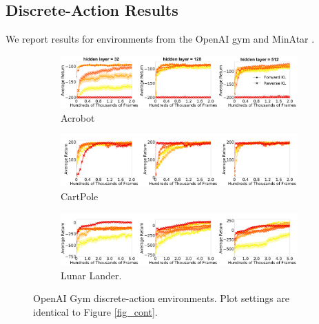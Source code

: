 \documentclass[twoside,11pt]{article}
\begin{document}
\subsection{Discrete-Action Results}
We report results for environments from the OpenAI gym \citep{brockman2016openai} and MinAtar \citep{young2019minatar}. 



\begin{figure}[t]
  \centering
  \begin{subfigure}[b]{1\linewidth}
    \centering
    \includegraphics[width=\columnwidth]{figs/deep/discrete/acrobot_combined.png} 
    \caption{Acrobot}\label{fig:acrobot}
  \end{subfigure}%
  
  \begin{subfigure}[b]{1\linewidth}
    \centering
    \includegraphics[width=\columnwidth]{figs/deep/discrete/cartpole_combined.png}
    \caption{CartPole}\label{fig:cartpole}
  \end{subfigure}
  
  \begin{subfigure}[b]{1\linewidth}
    \centering
    \includegraphics[width=\columnwidth]{figs/deep/discrete/lunar_combined.png}
    \caption{Lunar Lander.}
    \label{fig:lunar-lander}
  \end{subfigure}
  \caption{OpenAI Gym discrete-action environments. Plot settings are identical to Figure \ref{fig_cont}.}\label{fig:open-ai}
\end{figure}
\end{document}
